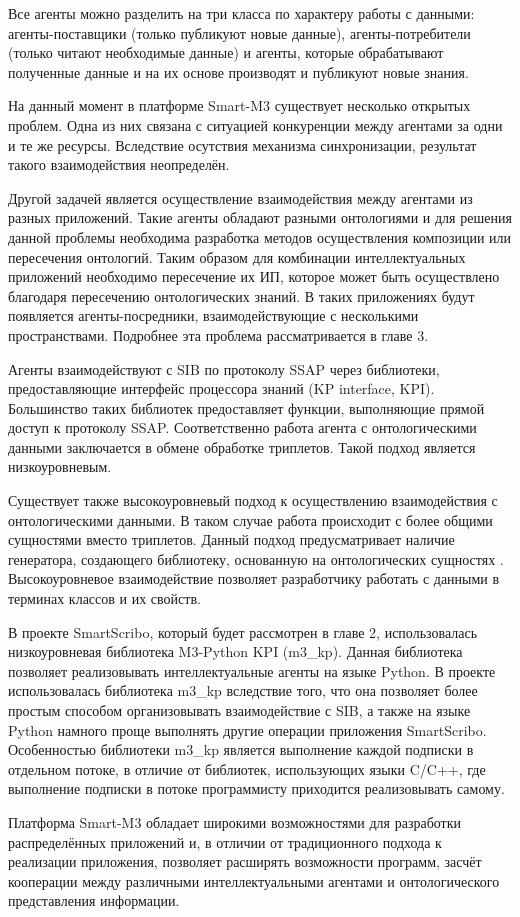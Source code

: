 Все агенты можно разделить на три класса по характеру работы с данными: агенты-поставщики (только публикуют новые данные), агенты-потребители (только читают необходимые данные) и агенты, которые обрабатывают полученные данные и на их основе производят и публикуют новые знания.

На данный момент в платформе Smart-M3 существует несколько открытых проблем. Одна из них связана с ситуацией конкуренции между агентами за одни и те же ресурсы. Вследствие осутствия механизма синхронизации, результат такого взаимодействия неопределён.

Другой задачей является осуществление взаимодействия между агентами из разных приложений. Такие агенты обладают разными онтологиями и для решения данной проблемы необходима разработка методов осуществления композиции или пересечения онтологий. Таким образом для комбинации интеллектуальных приложений необходимо пересечение их ИП, которое может быть осуществлено благодаря пересечению онтологических знаний. В таких приложениях будут появляется агенты-посредники, взаимодействующие с несколькими пространствами. Подробнее эта проблема рассматривается в главе 3.

Агенты взаимодействуют с SIB по протоколу SSAP через библиотеки, предоставляющие интерфейс процессора знаний (KP interface, KPI). Большинство таких библиотек предоставляет функции, выполняющие прямой доступ к протоколу SSAP. Соответственно работа агента с онтологическими данными заключается в обмене обработке триплетов. Такой подход является низкоуровневым.

Существует также высокоуровневый подход к осуществлению взаимодействия с онтологическими данными. В таком случае работа происходит с более общими сущностями вместо триплетов. Данный подход предусматривает наличие генератора, создающего библиотеку, основанную на онтологических сущностях \cite{korzun:smartslog}. Высокоуровневое взаимодействие позволяет разработчику работать с данными в терминах классов и их свойств.

В проекте SmartScribo, который будет рассмотрен в главе 2, использовалась низкоуровневая библиотека M3-Python KPI (m3\_kp). Данная библиотека позволяет реализовывать интеллектуальные агенты на языке Python. В проекте использовалась библиотека m3\_kp вследствие того, что она позволяет более простым способом организовывать взаимодействие с SIB, а также на языке Python намного проще выполнять другие операции приложения SmartScribo. Особенностью библиотеки m3\_kp является выполнение каждой подписки в отдельном потоке, в отличие от библиотек, использующих языки C/C++, где выполнение подписки в потоке программисту приходится реализовывать самому.

Платформа Smart-M3 обладает широкими возможностями для разработки распределённых приложений и, в отличии от традиционного подхода к реализации приложения, позволяет расширять возможности программ, засчёт кооперации между различными интеллектуальными агентами и онтологического представления информации.

